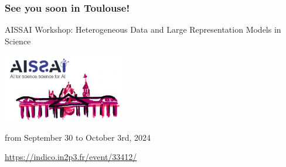 \begin{frame}
  \frametitle{See you soon in Toulouse!}
  \begin{center}\LARGE AISSAI Workshop: Heterogeneous Data and Large Representation Models in Science\end{center}
  \begin{center}\includegraphics[width=200px]{img/invitation.png}\end{center}

  \begin{center}\large from September 30 to October 3rd, 2024\end{center}
  \begin{center}\large \url{https://indico.in2p3.fr/event/33412/}\end{center}
\end{frame}
